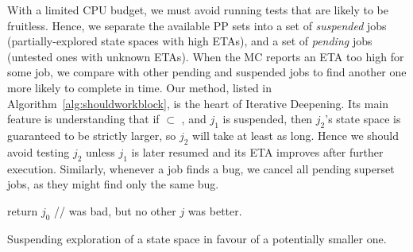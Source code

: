 With a limited CPU budget, we must avoid running tests that are likely to be fruitless.
Hence, we separate the available PP sets into a set of {\em suspended} jobs (partially-explored state spaces with high ETAs),
and a set of {\em pending} jobs (untested ones with unknown ETAs).
When the MC reports an ETA too high for some job,
we compare with other pending and suspended jobs to find another one more likely to complete in time.
%
Our method,
listed in Algorithm~\ref{alg:shouldworkblock}, is the heart of Iterative Deepening.
Its main feature is understanding that if  $\subset$ ,
and $j_1$ is suspended,
then $j_2$'s state space is guaranteed to be strictly larger, so $j_2$ will take at least as long.
Hence we should avoid testing $j_2$ unless $j_1$ is later resumed and its ETA improves after further execution. %
Similarly, whenever a job finds a bug, we cancel all pending superset jobs, as they might find only the same bug.

\begin{algorithm}[t]
	return $j_0$ //  was bad, but no other $j$ was better.
	\caption{Suspending exploration of a state space in favour of a potentially smaller one.}
	\label{alg:shouldworkblock}
\end{algorithm}

